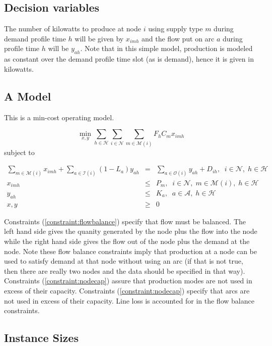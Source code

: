\documentclass[11pt]{article}
\begin{document}
\subsection{Decision variables}

The number of kilowatts to produce at node $i$ using supply type $m$ during demand profile time $h$ will be given by $x_{imh}$ and the flow put on arc $a$ during profile time $h$ will be $y_{ah}$. Note that in this simple model, production is modeled as constant over the demand profile time slot (as is demand), hence it is given in kilowatts.

\subsection{A Model}

This is a min-cost operating model.

$$
\min_{x,y} \sum_{h \in \mathcal{H}}\sum_{i \in \mathcal{N}}\sum_{m \in \mathcal{M}(i)}F_{h}C_{m}x_{imh}
$$
subject to

\begin{eqnarray}
\label{constraint:flowbalance}
\sum_{m \in \mathcal{M}(i)}x_{imh} + \sum_{a \in \mathcal{I}(i)}(1-L_{a})y_{ah} & = & \sum_{a \in \mathcal{O}(i)}y_{ah} + D_{ih}, \;\; i \in \mathcal{N},\; h \in \mathcal{H}  \\
\label{constraint:nodecap}
x_{imh} & \leq & P_{m}, \;\; i \in \mathcal{N},\; m \in \mathcal{M}(i), \; h \in \mathcal{H}  \\
\label{constraint:arccap}
y_{ah} & \leq & K_{a}, \;\; a \in \mathcal{A},\; h \in \mathcal{H}  \\
x,y & \geq & 0
\end{eqnarray}


Constraints (\ref{constraint:flowbalance}) specify that flow must be balanced. 
The left hand side gives the quanity generated by the node plus the flow into the node while the right
hand side gives the flow out of the node plus the demand at the node. Note these flow balance constraints imply 
that production at a node can be used to satisfy demand at that node without using an arc 
(if that is not true, then there are really two nodes and the data should be specified in that way). 
Constraints (\ref{constraint:nodecap}) assure that
production modes are not used in excess of their capacity. Constraints (\ref{constraint:nodecap}) specify that arcs are not 
used in excess of their capacity. Line loss is accounted for in the flow balance constraints.

\subsection{Instance Sizes}
\end{document}

